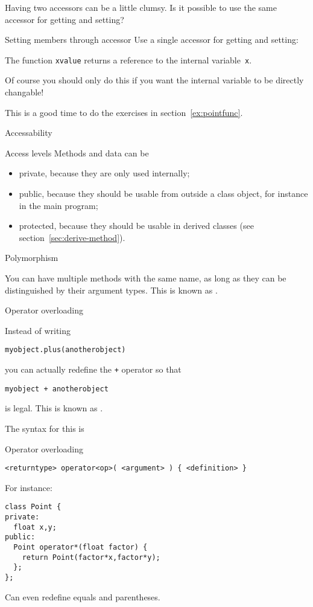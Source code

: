 Having two accessors can be a little clumsy. Is it possible to use the
same accessor for getting and setting?

\begin{block}{Setting members through accessor}
  \label{sl:setmember}
  Use a single accessor for getting and setting:

  The function \lstinline{xvalue} returns a reference to the internal
  variable~\lstinline{x}.
\end{block}

Of course you should only do this if you want the internal variable to
be directly changable!

\begin{exercise}
  This is a good time to do the exercises in section~\ref{ex:pointfunc}.
\end{exercise}

 {Accessability}

\begin{block}{Access levels}
  \label{sl:private-etc}
  Methods and data can be 
  \begin{itemize}
  \item private, because they are only used internally;
  \item public, because they should be usable from outside a class
    object, for instance in the main program;
  \item protected, because they should be usable in derived classes (see
    section~\ref{sec:derive-method}).
  \end{itemize}
\end{block}

 {Polymorphism}

You can have multiple methods with the same name, as long as they can
be distinguished by their argument types. This is known as .

 {Operator overloading}
\label{sec:operatordef}

Instead of writing 
\begin{lstlisting}
myobject.plus(anotherobject)
\end{lstlisting}
you can actually redefine the \lstinline{+} operator so that
\begin{lstlisting}
myobject + anotherobject
\end{lstlisting}
is legal. This is known as .

The syntax for this is
\begin{block}{Operator overloading}
  \label{sl:object-operator}
\begin{lstlisting}
<returntype> operator<op>( <argument> ) { <definition> }
\end{lstlisting}
For instance:
\begin{lstlisting}
class Point {
private:
  float x,y;
public:
  Point operator*(float factor) {
    return Point(factor*x,factor*y);
  };
};
\end{lstlisting}
Can even redefine equals and parentheses.
\end{block}

